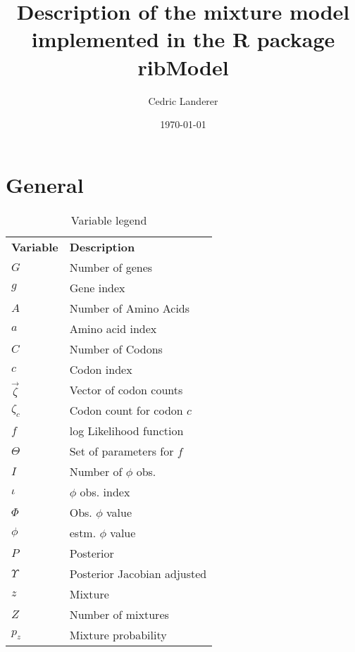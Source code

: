 \documentclass[11pt]{article}
\begin{document}
  \title{Description of the mixture model implemented in the R package ribModel}
  \author{Cedric Landerer} %
  \date{\today}
  \maketitle
  \doublespacing

  
  \section{General}
  \begin{table}[h]
    \centering
    \caption{Variable legend}
    \label{var_desc}
    \begin{tabular}{|l|l|}
      \cline{1-2}
      \textbf{Variable} & \textbf{Description}		\\ \cline{1-2}
      $G$		& Number of genes		\\ \cline{1-2}
      $g$		& Gene index			\\ \cline{1-2}
      $A$		& Number of Amino Acids		\\ \cline{1-2}
      $a$		& Amino acid index		\\ \cline{1-2}
      $C$		& Number of Codons		\\ \cline{1-2}
      $c$		& Codon index			\\ \cline{1-2}
      $\vec{\zeta}$	& Vector of codon counts	\\ \cline{1-2}
      $\zeta_c$		& Codon count for codon $c$	\\ \cline{1-2}
      $f$		& log Likelihood function	\\ \cline{1-2}
      $\Theta$		& Set of parameters for $f$	\\ \cline{1-2}
      $I$		& Number of $\phi$ obs.		\\ \cline{1-2}
      $\iota$		& $\phi$ obs. index		\\ \cline{1-2}
      $\Phi$		& Obs. $\phi$ value		\\ \cline{1-2}
      $\phi$		& estm. $\phi$ value		\\ \cline{1-2}
      $P$		& Posterior			\\ \cline{1-2}
      $\Upsilon$	& Posterior Jacobian adjusted	\\ \cline{1-2}
      $z$		& Mixture			\\ \cline{1-2}
      $Z$		& Number of mixtures		\\ \cline{1-2}
      $p_z$		& Mixture probability		\\ \cline{1-2}
    \end{tabular}
  \end{table}
  
\end{document}
